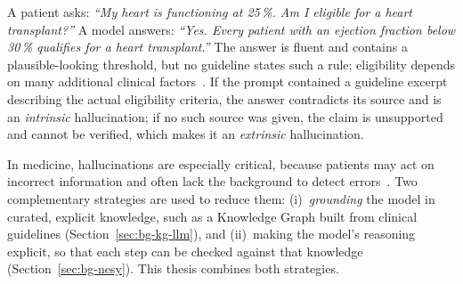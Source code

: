 \begin{bgexample}
A patient asks: \emph{``My heart is functioning at 25\,\%. Am I eligible for
a heart transplant?''} A model answers: \emph{``Yes. Every patient with an
ejection fraction below 30\,\% qualifies for a heart transplant.''} The
answer is fluent and contains a plausible-looking threshold, but no
guideline states such a rule; eligibility depends on many additional clinical
factors~\cite{mcdonagh2021esc}. If the prompt contained a guideline excerpt
describing the actual eligibility criteria, the answer contradicts its source
and is an \emph{intrinsic} hallucination; if no such source was given, the
claim is unsupported and cannot be verified, which makes it an
\emph{extrinsic} hallucination.
\end{bgexample}

In medicine, hallucinations are especially critical, because patients may
act on incorrect information and often lack the background to detect
errors~\cite{thirunavukarasu2023large}. Two complementary strategies are
used to reduce them: (i)~\emph{grounding} the model in curated, explicit
knowledge, such as a Knowledge Graph built from clinical guidelines
(Section~\ref{sec:bg-kg-llm}), and (ii)~making the model's reasoning
explicit, so that each step can be checked against that knowledge
(Section~\ref{sec:bg-nesy}). This thesis combines both strategies.
